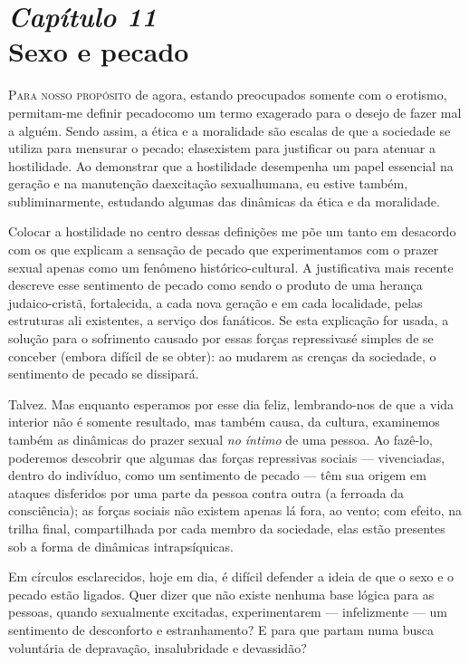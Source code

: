 \chapter[\textbf{11}\quad Sexo e pecado]{{\large\textit{Capítulo 11}}\\ Sexo e pecado}


\textsc{Para nosso propósito} de agora, estando preocupados somente com o
erotismo, permitam-me definir pecado\idxpecad[|(] como um termo exagerado para o
desejo de fazer mal a alguém. Sendo assim, a ética e a\idxpervrespo{} moralidade\idxrespo{} são
escalas de que a sociedade se utiliza para mensurar o pecado; elas\idxsexuehos[|(]
existem para justificar ou para atenuar a hostilidade. Ao demonstrar
que a hostilidade desempenha um papel essencial na geração e na\idxpecaddel{}
manutenção da\idxsexue[|(] excitação sexual\idxhostexci[|(] humana, eu estive também,
subliminarmente, estudando algumas das dinâmicas da ética e da
moralidade.

Colocar a hostilidade no centro dessas definições me põe um tanto em
desacordo com os que explicam a sensação de pecado que experimentamos
com o prazer sexual apenas como um fenômeno histórico-cultural. A
justificativa mais recente descreve esse sentimento de pecado como
sendo o produto de uma herança judaico-cristã, fortalecida, a cada
nova geração e em cada localidade, pelas estruturas ali existentes, a
serviço dos fanáticos. Se esta explicação for usada, a solução para o
sofrimento causado por essas forças repressivas\idxaspecrep[|(] é simples de se
conceber (embora difícil de se obter): ao mudarem as crenças da
sociedade, o sentimento de pecado se dissipará.

Talvez. Mas enquanto esperamos por esse dia feliz, lembrando-nos de
que a vida interior não é somente resultado, mas também causa, da
cultura, examinemos também as dinâmicas\idxsexuedin{} do prazer sexual \textit{no
íntimo} de uma pessoa. Ao fazê-lo, poderemos descobrir que algumas das
forças repressivas sociais --- vivenciadas, dentro do indivíduo, como
um sentimento de pecado --- têm sua origem em ataques disferidos por
uma parte da pessoa contra outra (a ferroada da consciência); as forças
sociais não existem apenas lá fora, ao vento; com efeito, na trilha
final, compartilhada por cada membro da sociedade, elas estão presentes
sob a forma de dinâmicas intrapsíquicas.

Em círculos esclarecidos, hoje em dia, é difícil defender a ideia de
que o sexo e o pecado estão ligados. Quer dizer que não existe nenhuma
base lógica para as pessoas, quando sexualmente excitadas,
experimentarem --- infelizmente --- um sentimento de desconforto e
estranhamento? E para que partam numa busca voluntária de depravação,
insalubridade e devassidão?

